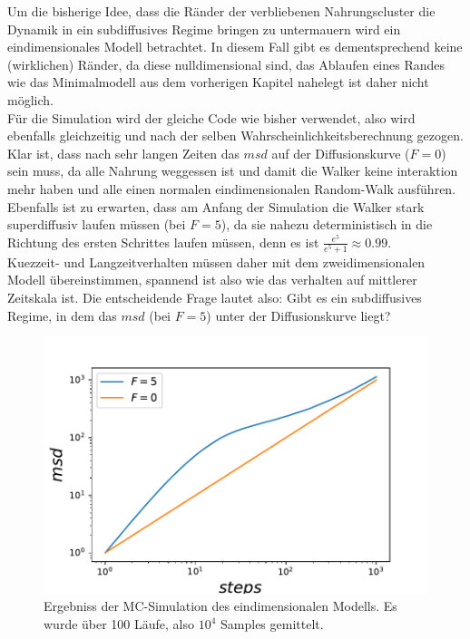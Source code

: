 \documentclass[a4paper, 12pt]{report}
\begin{document}
Um die bisherige Idee, dass die Ränder der verbliebenen Nahrungscluster die Dynamik in ein subdiffusives Regime bringen zu untermauern wird ein eindimensionales Modell betrachtet. In diesem Fall gibt es dementsprechend keine (wirklichen) Ränder, da diese nulldimensional sind, das Ablaufen eines Randes wie das Minimalmodell aus dem vorherigen Kapitel nahelegt ist daher nicht möglich. 
\\
Für die Simulation wird der gleiche Code wie bisher verwendet, also wird ebenfalls gleichzeitig und nach der selben Wahrscheinlichkeitsberechnung gezogen. 
\\
Klar ist, dass nach sehr langen Zeiten das $msd$ auf der Diffusionskurve ($F=0$) sein muss, da alle Nahrung weggessen ist und damit die Walker keine interaktion mehr haben und alle einen normalen eindimensionalen Random-Walk ausführen.
\\
Ebenfalls ist zu erwarten, dass am Anfang der Simulation die Walker stark superdiffusiv laufen müssen (bei $F=5$), da sie nahezu deterministisch in die Richtung des ersten Schrittes laufen müssen, denn es ist $\frac{e^5}{e^5 + 1} \approx 0.99$. 
\\
Kuezzeit- und Langzeitverhalten müssen daher mit dem zweidimensionalen Modell übereinstimmen, spannend ist also wie das verhalten auf mittlerer Zeitskala ist. Die entscheidende Frage lautet also: Gibt es ein subdiffusives Regime, in dem das $msd$ (bei $F=5$) unter der Diffusionskurve liegt? 

\begin{figure}[H]
	\centering
	\includegraphics[scale=0.85]{onedmsd.pdf}
	\caption{Ergebniss der MC-Simulation des eindimensionalen Modells. Es wurde über 100 Läufe, also $10^4$ Samples gemittelt.}
\end{figure}
\end{document}
